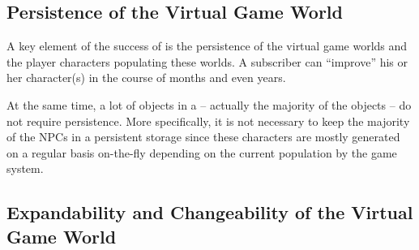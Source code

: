 \documentclass[a4paper, 10pt]{book}
\begin{document}
\subsection{Persistence of the Virtual Game World} 
\label{sec:persistence}

A key element of the success of \MMORGS is the persistence of the
virtual game worlds and the player characters populating these worlds. A
subscriber can ``improve'' his or her character(s) in the course of months
and even years.

At the same time, a lot of objects in a \MMORG -- actually the majority of
the objects -- do not require persistence. More specifically, it is not necessary
to keep the majority of the NPCs in a persistent storage since these characters
are mostly generated on a regular basis on-the-fly depending on the current 
population by the game system.

\subsection{Expandability and Changeability of the Virtual Game World}
\label{sec:expandability-changeability}
\end{document}
